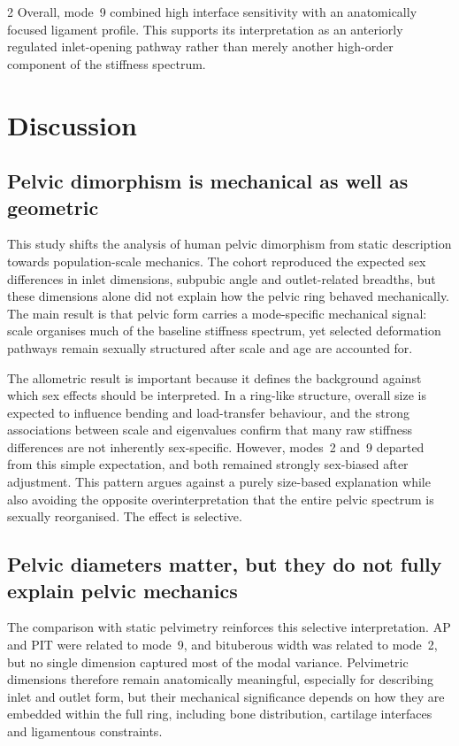 \documentclass[openacc]{rsproca_new}
\begin{document}
\begin{multicols}{2}
Overall, mode~9 combined high interface sensitivity with an anatomically focused ligament profile. This supports its interpretation as an anteriorly regulated inlet-opening pathway rather than merely another high-order component of the stiffness spectrum.

\section{Discussion}
\subsection{Pelvic dimorphism is mechanical as well as geometric}

This study shifts the analysis of human pelvic dimorphism from static description towards population-scale mechanics. The cohort reproduced the expected sex differences in inlet dimensions, subpubic angle and outlet-related breadths, but these dimensions alone did not explain how the pelvic ring behaved mechanically. The main result is that pelvic form carries a mode-specific mechanical signal: scale organises much of the baseline stiffness spectrum, yet selected deformation pathways remain sexually structured after scale and age are accounted for.

The allometric result is important because it defines the background against which sex effects should be interpreted. In a ring-like structure, overall size is expected to influence bending and load-transfer behaviour, and the strong associations between scale and eigenvalues confirm that many raw stiffness differences are not inherently sex-specific. However, modes~2 and~9 departed from this simple expectation, and both remained strongly sex-biased after adjustment. This pattern argues against a purely size-based explanation while also avoiding the opposite overinterpretation that the entire pelvic spectrum is sexually reorganised. The effect is selective.

\subsection{Pelvic diameters matter, but they do not fully explain pelvic mechanics}

The comparison with static pelvimetry reinforces this selective interpretation. AP and PIT were related to mode~9, and bituberous width was related to mode~2, but no single dimension captured most of the modal variance. Pelvimetric dimensions therefore remain anatomically meaningful, especially for describing inlet and outlet form, but their mechanical significance depends on how they are embedded within the full ring, including bone distribution, cartilage interfaces and ligamentous constraints.


\end{multicols}
\end{document}
